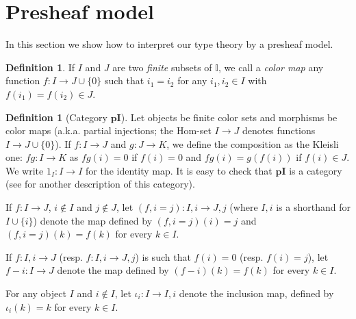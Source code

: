 \documentclass[english]{PaperTools/latex/entcs}
\theoremstyle{plain}
\theoremstyle{definition}
\newtheorem{definition}[theorem]{Definition}
\theoremstyle{remark}
\def\pI{\ensuremath{\mathbf{pI}}}
\begin{document}
\section{Presheaf model}
\label{sec:model}
In this section we show how to interpret our type theory by a presheaf model.

\begin{definition}
  If $I$ and $J$ are two \emph{finite} subsets of $𝕀$, we call a
  \emph{color map} any function $f : I → J ∪ \{0\}$ such that
  $i_1 = i_2$ for any $i_1, i_2 ∈ I$ with $f(i_1) = f(i_2) ∈ J$.
\end{definition}

\begin{definition}[Category $\pI{}$]
  \label{def:pI}
  Let objects be finite color sets and morphisms be color maps
  (a.k.a. partial injections; the Hom-set $I → J$ denotes functions $I → J ∪ \{0\}$).
  If $f : I → J$ and $g : J → K$, we define the composition as the
  Kleisli one: $fg : I → K$
  as $fg(i) = 0$ if $f(i) = 0$ and $fg(i) = g(f(i))$ if $f(i) ∈ J$.
  We write $1_I : I → I$ for the identity map.
  It is easy to check that \pI{} is a category (see \cite[ex.~9.7
  p.~176]{PittsAM:nomsns} for another description of this category).
\end{definition}

If $f : I → J$, $i ∉ I$ and $j ∉ J$, let
$(f, i = j) : I,i → J,j$ (where $I,i$ is a shorthand for $I ∪ \{i\}$) denote the map
defined by $(f,i=j)(i) = j$ and $(f,i=j)(k) = f(k)$ for every $k ∈ I$.

If $f : I,i → J$ (resp. $f : I,i → J,j$) is such that $f(i) = 0$ (resp.
$f(i) = j$), let $f-i : I → J$ denote the map defined by $(f-i)(k) = f(k)$
for every $k ∈ I$.

For any object $I$ and $i ∉ I$, let $ι_i : I → I,i$ denote the inclusion
map, defined by $ι_i(k) = k$ for every $k ∈ I$.
\end{document}
